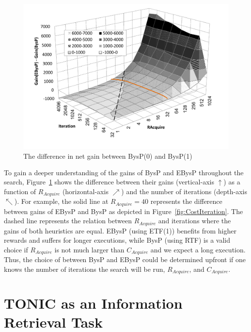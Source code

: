 \documentclass[prodmode,acmtecs]{acmsmall} %
\begin{document}
\begin{figure}
\centering
\includegraphics[width=0.7\linewidth]{reward.pdf}%
\caption{The difference in net gain between BysP(0) and BysP(1)}%
\label{fig:reward3d}
\end{figure}



To gain a deeper understanding of the gains of BysP and EBysP throughout the
search, Figure~\ref{fig:reward3d} shows the difference between their gains (vertical-axis $\uparrow$) as a function of \(R_{Acquire}\)
(horizontal-axis $\nearrow$) and the number of iterations (depth-axis
$\nwarrow$). For example, the solid line at \(R_{Acquire}=40\) represents the
difference between gains of EBysP and BysP as depicted in
Figure~\ref{fig:CostIteration}. The dashed line represents the relation between
\(R_{Acquire}\) and iterations where the gains of both heuristics are equal. EBysP (using ETF(1))
benefits from higher rewards and suffers for longer executions, while BysP (using RTF) is a valid choice if $R_{Acquire}$ is not much larger than $C_{Acquire}$ and we expect a long execution. 
Thus, the choice of between BysP and EBysP could be determined upfront if one knows the
number of iterations the search will be run, $R_{Acquire}$, and $C_{Acquire}$. 


\section{TONIC as an Information Retrieval Task}
\label{sec:ir}
\end{document}
